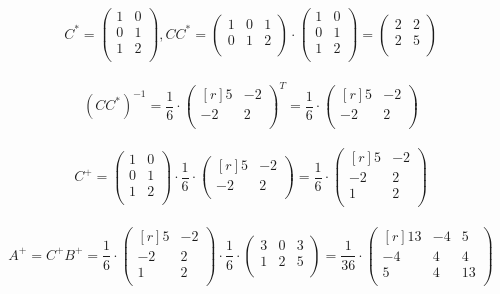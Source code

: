\documentclass[12pt]{article}
\theoremstyle{definition}
\numberwithin{equation}{section}
\begin{document}
\[C^* = \begin{pmatrix}
1 & 0 \\         
0 & 1 \\
1 & 2 \\
\end{pmatrix}, CC^* = \begin{pmatrix}
1 & 0 & 1 \\         
0 & 1 & 2 \\
\end{pmatrix} \cdot \begin{pmatrix}
1 & 0 \\         
0 & 1 \\
1 & 2 \\
\end{pmatrix} = \begin{pmatrix}
2 & 2 \\         
2 & 5 \\
\end{pmatrix}\]\\
\[(CC^*)^{-1} = \frac{1}{6} \cdot \begin{pmatrix}[r]
5 & -2 \\         
-2 & 2 \\
\end{pmatrix}^T = \frac{1}{6} \cdot \begin{pmatrix}[r]
5 & -2 \\         
-2 & 2 \\
\end{pmatrix}\]\\
\[C^+ = \begin{pmatrix}
1 & 0 \\         
0 & 1 \\
1 & 2 \\
\end{pmatrix} \cdot \frac{1}{6} \cdot \begin{pmatrix}[r]
5 & -2 \\         
-2 & 2 \\
\end{pmatrix} = \frac{1}{6} \cdot \begin{pmatrix}[r]
5 & -2 \\         
-2 & 2 \\
1 & 2 \\
\end{pmatrix}\]\\
\[A^+ = C^+B^+ = \frac{1}{6} \cdot \begin{pmatrix}[r]
5 & -2 \\         
-2 & 2 \\
1 & 2 \\
\end{pmatrix} \cdot \frac{1}{6} \cdot \begin{pmatrix}
3 & 0 & 3 \\         
1 & 2 & 5 \\
\end{pmatrix} = \frac{1}{36} \cdot \begin{pmatrix}[r]
13 & -4 & 5 \\         
-4 & 4 & 4 \\
5 & 4 & 13 \\
\end{pmatrix}\]\\
\end{document}
